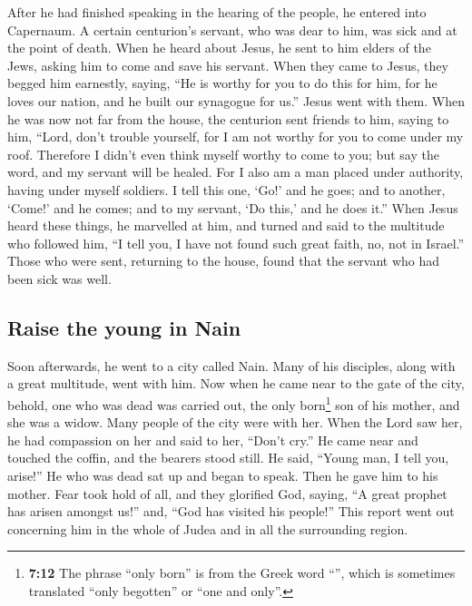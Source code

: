  After he had finished speaking in the hearing of the
people, he entered into Capernaum.  A certain centurion's
servant, who was dear to him, was sick and at the point of death.
 When he heard about Jesus, he sent to him elders of the
Jews, asking him to come and save his servant.  When they
came to Jesus, they begged him earnestly, saying, ``He is worthy for you
to do this for him,  for he loves our nation, and he built
our synagogue for us.''  Jesus went with them. When he was
now not far from the house, the centurion sent friends to him, saying to
him, ``Lord, don't trouble yourself, for I am not worthy for you to come
under my roof.  Therefore I didn't even think myself
worthy to come to you; but say the word, and my servant will be healed.
 For I also am a man placed under authority, having under
myself soldiers. I tell this one, `Go!' and he goes; and to another,
`Come!' and he comes; and to my servant, `Do this,' and he does it.''
 When Jesus heard these things, he marvelled at him, and
turned and said to the multitude who followed him, ``I tell you, I have
not found such great faith, no, not in Israel.''  Those
who were sent, returning to the house, found that the servant who had
been sick was well.

\hypertarget{raise-the-young-in-nain}{%
\subsection{Raise the young in Nain}\label{raise-the-young-in-nain}}

 Soon afterwards, he went to a city called Nain. Many of
his disciples, along with a great multitude, went with him.
 Now when he came near to the gate of the city, behold,
one who was dead was carried out, the only born\footnote{\textbf{7:12}
  The phrase ``only born'' is from the Greek word ``'',
  which is sometimes translated ``only begotten'' or ``one and only''.}
son of his mother, and she was a widow. Many people of the city were
with her.  When the Lord saw her, he had compassion on
her and said to her, ``Don't cry.''  He came near and
touched the coffin, and the bearers stood still. He said, ``Young man, I
tell you, arise!''  He who was dead sat up and began to
speak. Then he gave him to his mother.  Fear took hold of
all, and they glorified God, saying, ``A great prophet has arisen
amongst us!'' and, ``God has visited his people!''  This
report went out concerning him in the whole of Judea and in all the
surrounding region.

